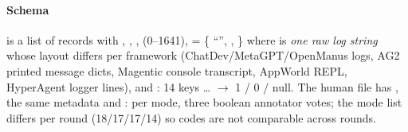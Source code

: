 \paragraph{Schema}  is a list of records with , , ,  (0--1641),  = \{ ``'', , \} where  is \emph{one raw log string} whose layout differs per framework (ChatDev/MetaGPT/OpenManus logs, AG2 printed message dicts, Magentic console transcript, AppWorld REPL, HyperAgent logger lines), and : 14 keys \ldots{} $\to$ 1 / 0 / null. The human file has , the same metadata and : per mode, three boolean annotator votes; the mode list differs per round (18/17/17/14) so codes are not comparable across rounds.

